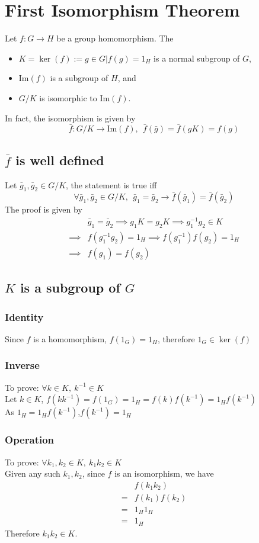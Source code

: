 \documentclass{article}
\renewcommand{\Im}{\text{Im}}
\begin{document}
	\section*{First Isomorphism Theorem}
	Let $f:G\rightarrow H$ be a group homomorphism. The
	\begin{itemize}
		\item $K=\ker(f):={g\in G|f(g)=1_H}$ is a normal subgroup of $G$,
		\item $\Im(f)$ is a subgroup of $H$, and
		\item $G/K$ is isomorphic to $\Im(f)$.
	\end{itemize}
	In fact, the isomorphism is given by$$
		\bar{f}:G/K\rightarrow\Im(f),\ \ \bar{f}(\bar{g})=\bar{f}(gK)=f(g)
	$$
	\subsection*{$\bar{f}$ is well defined}
	Let $\bar{g}_1,\bar{g}_2\in G/K$, the statement is true iff$$
		\forall \bar{g}_1,\bar{g}_2\in G/K,\ \ \bar{g}_1=\bar{g}_2 \rightarrow \bar{f}(\bar{g}_1)=\bar{f}(\bar{g}_2)
	$$
	The proof is given by\begin{align*}
		&\bar{g}_1=\bar{g}_2 \implies g_1K=g_2K \implies g_1^{-1}g_2\in K\\
		\implies& f(g_1^{-1}g_2)=1_H \implies f(g_1^{-1})f(g_2)=1_H\\
		\implies& f(g_1)=f(g_2)
	\end{align*}
	\subsection*{$K$ is a subgroup of $G$}
	\subsubsection*{Identity}
	Since $f$ is a homomorphism, $f(1_G)=1_H$, therefore $1_G\in\ker(f)$
	\subsubsection*{Inverse}
	To prove: $\forall k\in K,\ k^{-1}\in K
	$\\
	Let $k\in K$, $f(kk^{-1})=f(1_G)=1_H=f(k)f(k^{-1})=1_Hf(k^{-1})$\\
	As $1_H=1_Hf(k^{-1})$,$f(k^{-1})=1_H$
	\subsubsection*{Operation}
	To prove: $
		\forall k_1,k_2\in K,\ k_1k_2\in K
	$\\
	Given any such $k_1,k_2$, since $f$ is an isomorphism, we have\begin{align*}
		&f(k_1k_2)\\
		=&f(k_1)f(k_2)\\
		=&1_H1_H\\
		=&1_H
	\end{align*}
	Therefore $k_1k_2\in K$.
\end{document}
